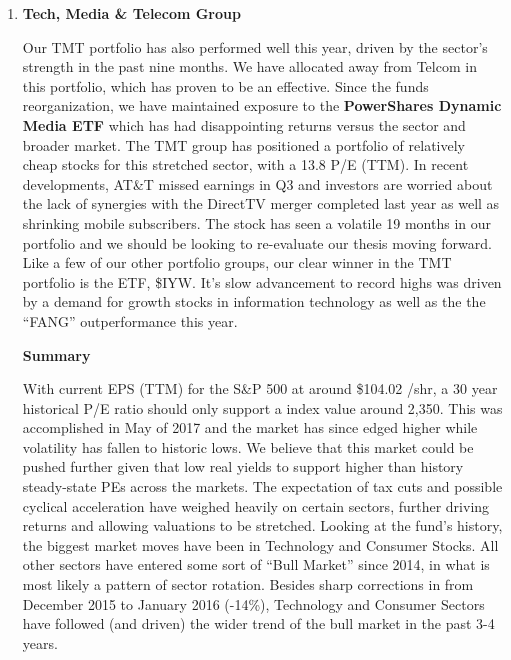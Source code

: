 \documentclass[11pt,pressrelease]{newlfm} %
\begin{document}
\begin{newlfm}
\begin{singlespace}
\begin{enumerate}
\item \textbf{Tech, Media \& Telecom Group} \par
Our TMT portfolio has also performed well this year, driven by the sector's strength in the past nine months. We have allocated away from Telcom in this portfolio, which has proven to be an effective. Since the funds reorganization, we have maintained exposure to the \textbf{PowerShares Dynamic Media ETF} which has had disappointing returns versus the sector and broader market. The TMT group has positioned a portfolio of relatively cheap stocks for this stretched sector, with a 13.8 P/E (TTM). In recent developments, AT\&T missed earnings in Q3 and investors are worried about the lack of synergies with the DirectTV merger completed last year as well as shrinking mobile subscribers. The stock has seen a volatile 19 months in our portfolio and we should be looking to re-evaluate our thesis moving forward. Like a few of our other portfolio groups, our clear winner in the TMT portfolio is the ETF, \$IYW. It's slow advancement to record highs was driven by a demand for growth stocks in information technology as well as the the ``FANG'' outperformance this year.


\center \textbf{Summary} \par
\raggedright
With current EPS (TTM) for the S\&P 500 at around \$104.02 /shr, a 30 year historical P/E ratio should only support a index value around 2,350. This was accomplished in May of 2017 and the market has since edged higher while volatility has fallen to historic lows. We believe that this market could be pushed further given that low real yields to support higher than history steady-state PEs across the markets. The expectation of tax cuts and possible cyclical acceleration have weighed heavily on certain sectors, further driving returns and allowing valuations to be stretched. Looking at the fund's history, the biggest market moves have been in Technology and Consumer Stocks. All other sectors have entered some sort of ``Bull Market'' since 2014, in what is most likely a pattern of sector rotation. Besides sharp corrections in from December 2015 to January 2016 (-14\%), Technology and Consumer Sectors have followed (and driven) the wider trend of the bull market in the past 3-4 years. %


\end{enumerate}
\end{singlespace}
\end{newlfm}
\end{document}
